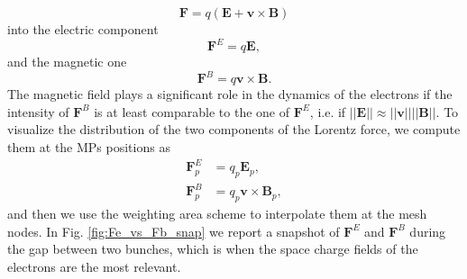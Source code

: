 \begin{equation*}
    \mathbf{F} = q \left(\mathbf{E} + \mathbf{v}\times \mathbf{B}\right)
\end{equation*}
into the electric component
\begin{equation*}
    \mathbf{F}^E = q \mathbf{E},
\end{equation*}
and the magnetic one
\begin{equation*}
    \mathbf{F}^B = q \mathbf{v}\times \mathbf{B}.
\end{equation*}
The magnetic field plays a significant role in the dynamics of the electrons if the intensity of $\mathbf{F}^B$ is at least comparable to the one of $\mathbf{F}^E$, i.e. if $||\mathbf{E}||\approx||\mathbf{v}||||\mathbf{B}||$. To visualize the distribution of the two components of the Lorentz force, we compute them at the MPs positions as
\begin{equation*}
    \begin{split}
        \mathbf{F}^E_p &= q_p \mathbf{E}_p,\\
        \mathbf{F}^B_p &= q_p \mathbf{v} \times \mathbf{B}_p,
    \end{split}
\end{equation*}
and then we use the weighting area scheme to interpolate them at the mesh nodes. In Fig. \ref{fig:Fe_vs_Fb_snap} we report a snapshot of $\mathbf{F}^E$ and $\mathbf{F}^B$ during the gap between two bunches, which is when the space charge fields of the electrons are the most relevant. 
